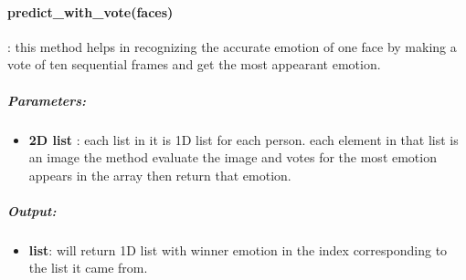 \begin{comment}

\begin{itemize}
	\item call method:
	\begin{lstlisting}[language=Python]
	model.predict(faces, prob_emotion=False)\end{lstlisting}
\end{itemize}
\end{comment}

\paragraph{predict\_with\_vote(faces)}:
this method helps in recognizing the accurate emotion of one face by making a vote of ten sequential frames and get the most appearant emotion. \newline

\subparagraph{Parameters:}
\begin{changemargin}{0.5cm}{0cm}
\begin{itemize}
	\item \textbf{2D list }:\newline
	each list in it is 1D list for each person. each element in that list is an image the method evaluate the image and votes for the most emotion appears in the array then return that emotion.
\end{itemize}
\end{changemargin}

\subparagraph{Output:}
\begin{changemargin}{0.5cm}{0cm}
\begin{itemize}
	\item \textbf{list}:\newline
	will return 1D list with winner emotion in the index corresponding to the list it came from.
\end{itemize}
\end{changemargin}

\begin{comment}
\subparagraph{Usage}:
\begin{changemargin}{0.5cm}{0cm}

\begin{itemize}
	\item call method:
	\begin{lstlisting}[language=Python]
	model.predict_with_vote(faces)\end{lstlisting}
\end{itemize}
\end{changemargin}
\end{comment}

